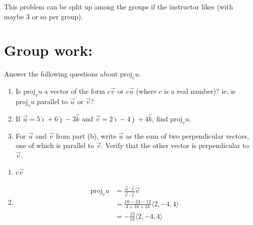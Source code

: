 \documentclass[noinstructornotes]{ximera}
\begin{document}
\begin{instructorNotes}
This problem can be split up among the groups if the instructor likes (with maybe 3 or so per group).  
\end{instructorNotes}






\section{Group work:}

\begin{problem}
Answer the following questions about $\text{proj}_v u$.
	\begin{enumerate}
	\item  Is $\text{proj}_v u$ a vector of the form $c \vec{v}$ or $c \vec{u}$ (where $c$ is a real number)?  
	ie, is $\text{proj}_v u$ parallel to $\vec{u}$ or $\vec{v}$?  
	
	\item  If $\vec{u} = 5 \hat{\imath} + 6 \hat{\jmath} - 3 \hat{k}$ and $\vec{v} = 2 \hat{\imath} - 4 \hat{\jmath} + 4 \hat{k}$, find $\text{proj}_v u$.
	
	\item  For $\vec{u}$ and $\vec{v}$ from part (b), write $\vec{u}$ as the sum of two perpendicular vectors, one of which is parallel to $\vec{v}$.  Verify that the other vector is perpendicular to $\vec{v}$.
	\end{enumerate}
	
	\begin{freeResponse}
	\begin{enumerate}
	\item  $\boxed{c \vec{v}}$
	
	\item  
		\begin{align*}
		\text{proj}_v u 
		&= \frac{\vec{u} \cdot \vec{v}}{\vec{v} \cdot \vec{v}} \vec{v}  \\
		&= \frac{10-24-12}{4+16+16} \langle 2,-4,4 \rangle  \\
		&= \boxed{- \frac{13}{18} \langle 2,-4,4 \rangle  }
		\end{align*}
	
	
	

\end{enumerate}
\end{freeResponse}
\end{problem}
\end{document}
